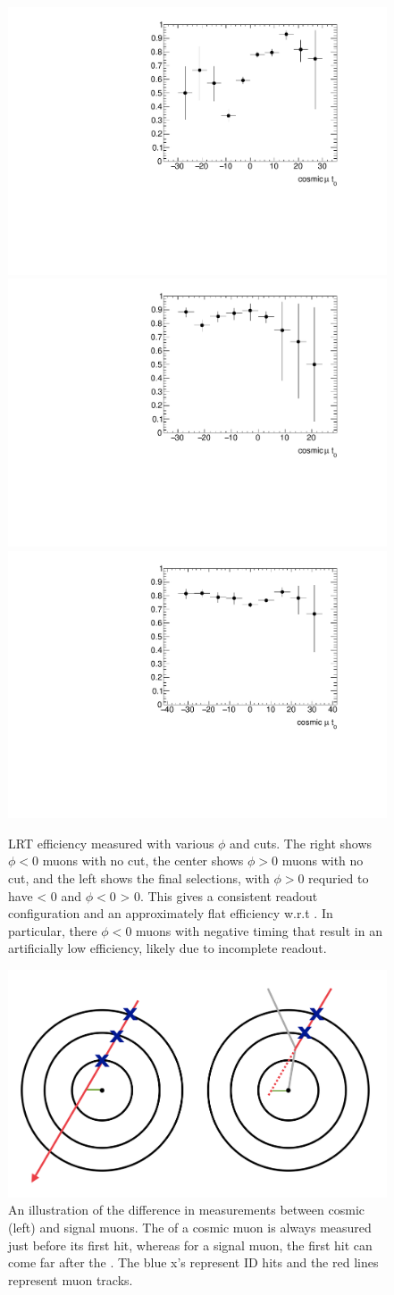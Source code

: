 \begin{figure}[htbp]
\centering
\includegraphics[width=.3\textwidth]{figures/LRT_systs/cosmics_phil0_eff_t0.pdf}
\includegraphics[width=.3\textwidth]{figures/LRT_systs/cosmics_phig0_eff_t0.pdf}
\includegraphics[width=.3\textwidth]{figures/LRT_systs/cosmics_eff_t0.pdf}
\caption{LRT efficiency measured with various $\phi$ and \tavg cuts. The right shows $\phi < 0$ muons with no \tavg cut, the center shows $\phi > 0$ muons with no \tavg cut, and the left shows the final selections, with $\phi > 0$ requried to have \tavg < 0 and $\phi < 0$ \tavg > 0. This gives a consistent readout configuration and an approximately flat efficiency w.r.t \tavg. In particular, there $\phi < 0$ muons with negative timing that result in an artificially low efficiency, likely due to incomplete readout.}
\label{fig:cos_sys_t0}
\end{figure}


\begin{figure}[htbp]
\centering
\includegraphics[width=.6\textwidth]{figures/LRT_systs/cos_sig_LRT.png}
\caption{An illustration of the difference in \dz measurements between cosmic (left) and signal muons. The \dz of a cosmic muon is always measured just before its first hit, whereas for a signal muon, the first hit can come far after the \dz. The blue x's represent ID hits and the red lines represent muon tracks.}
\label{fig:lrt_sig_sketch}
\end{figure}


